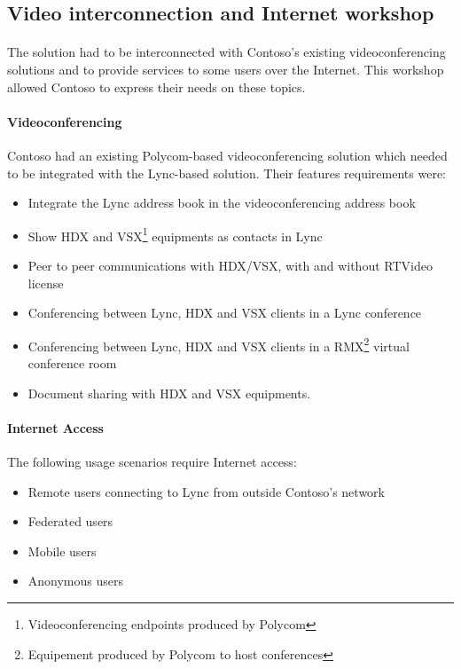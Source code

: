 \subsection{Video interconnection and Internet workshop}
	\paragraph{}
	The solution had to be interconnected with Contoso's existing videoconferencing solutions and to provide services to some users over the Internet. This workshop allowed Contoso to express their needs on these topics.

	\paragraph{Videoconferencing}
	Contoso had an existing Polycom-based videoconferencing solution which needed to be integrated with the Lync-based solution. Their features requirements were:
	\begin{itemize}
	\item Integrate the Lync address book in the videoconferencing address book
	\item Show HDX and VSX\footnote{Videoconferencing endpoints produced by Polycom} equipments as contacts in Lync
	\item Peer to peer communications with HDX/VSX, with and without RTVideo license
	\item Conferencing between Lync, HDX and VSX clients in a Lync conference
	\item Conferencing between Lync, HDX and VSX clients in a RMX\footnote{Equipement produced by Polycom to host conferences} virtual conference room
	\item Document sharing with HDX and VSX equipments.
	\end{itemize}



	\paragraph{Internet Access}
	The following usage scenarios require Internet access:
	\begin{itemize}
		\item Remote users connecting to Lync from outside Contoso's network
		\item Federated users
		\item Mobile users
		\item Anonymous users
	\end{itemize}

